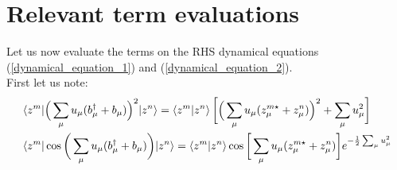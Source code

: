 \documentclass[prb]{revtex4}
\newcommand{\eq}[1]{\begin{align}#1\end{align}}
\begin{document}
\section{Relevant term evaluations}

Let us now evaluate the terms on the RHS dynamical equations (\ref{dynamical_equation_1}) and (\ref{dynamical_equation_2}). \\

First let us note:
\eq{
& \braket{ z^m | \Big( \sum_\mu u_\mu (b_\mu^\dag + b_\mu)  \Big)^2 | z^n } = \braket{z^m | z^n} \bigg[ \Big(\sum_\mu u_\mu (z_\mu^{m\star} + z_\mu^n)\Big)^2 +\sum_\mu u_\mu^2  \bigg] \notag \\
& \braket{ z^m |\cos\bigg( \sum_\mu u_\mu (b_\mu^\dag + b_\mu)  \bigg) |z^n } = \braket{z^m|z^n} \cos\bigg[ \sum_\mu u_\mu (z_\mu^{m\star}+z_\mu^{n}) \bigg]e^{-\frac{1}{2}\sum_\mu u_\mu^2}
}
\end{document}
